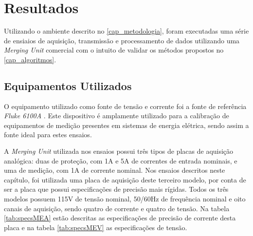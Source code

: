 


\label{cap_resultados}
\chapter{Resultados}

Utilizando o ambiente descrito no \autoref{cap_metodologia}, foram executadas uma série de ensiaios de aquisição, transmissão e processamento de dados utilizando uma \textit{Merging Unit} comercial com o intuito de validar os métodos propostos no \autoref{cap_algoritmos}. 

\section{Equipamentos Utilizados}

O equipamento utilizado como fonte de tensão e corrente foi a fonte de referência \textit{Fluke 6100A} \cite{fluke6100a}. Este dispositivo é amplamente utilizado para a calibração de equipamentos de medição presentes em sistemas de energia elétrica, sendo assim a fonte ideal para estes ensaios.

A \textit{Merging Unit} utilizada nos ensaios possui três tipos de placas de aquisição analógica: duas de proteção, com 1A e 5A de correntes de entrada nominais, e uma de medição, com 1A de corrente nominal. Nos ensaios descritos neste capítulo, foi utilizada uma placa de aquisição deste terceiro modelo, por conta de ser a placa que possui especificações de precisão mais rígidas. Todos os três modelos possuem 115V de tensão nominal, 50/60Hz de frequência nominal e oito canais de aquisição, sendo quatro de corrente e quatro de tensão. Na tabela \ref{tab:specsMEA} estão descritas as especificações de precisão de corrente desta placa e na tabela \ref{tab:specsMEV} as especificações de tensão.


